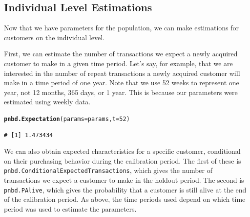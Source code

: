 \documentclass[10pt, letterpaper, onecolumn, oneside, final]{article}\usepackage[]{graphicx}\usepackage[]{color}
\makeatletter
\newcommand{\hlnum}[1]{\textcolor[rgb]{0.686,0.059,0.569}{#1}}%
\newcommand{\hlstd}[1]{\textcolor[rgb]{0.345,0.345,0.345}{#1}}%
\newcommand{\hlkwc}[1]{\textcolor[rgb]{0.333,0.667,0.333}{#1}}%
\newcommand{\hlkwd}[1]{\textcolor[rgb]{0.737,0.353,0.396}{\textbf{#1}}}%
\newenvironment{kframe}{%
 \def\at@end@of@kframe{}%
 \ifinner\ifhmode%
  \def\at@end@of@kframe{\end{minipage}}%
  \begin{minipage}{\columnwidth}%
 \fi\fi%
 \def\FrameCommand##1{\hskip\@totalleftmargin \hskip-\fboxsep
 \colorbox{shadecolor}{##1}\hskip-\fboxsep
     \hskip-\linewidth \hskip-\@totalleftmargin \hskip\columnwidth}%
 \MakeFramed {\advance\hsize-\width
   \@totalleftmargin\z@ \linewidth\hsize
   \@setminipage}}%
 {\par\unskip\endMakeFramed%
 \at@end@of@kframe}
\newenvironment{knitrout}{}{} %
\makeatother
\begin{document}
\subsection{Individual Level Estimations}
Now that we have parameters for the population, we can make
estimations for customers on the individual level.

First, we can estimate the number of transactions we expect a newly
acquired customer to make in a given time period. Let's say, for
example, that we are interested in the number of repeat transactions a
newly acquired customer will make in a time period of one year. Note
that we use 52 weeks to represent one year, not 12 months, 365 days,
or 1 year. This is because our parameters were estimated using weekly
data.

\begin{knitrout}
\color{fgcolor}\begin{kframe}
\begin{alltt}
\hlkwd{pnbd.Expectation}\hlstd{(}\hlkwc{params} \hlstd{= params,} \hlkwc{t} \hlstd{=} \hlnum{52}\hlstd{)}
\end{alltt}
\begin{verbatim}
# [1] 1.473434
\end{verbatim}
\end{kframe}
\end{knitrout}

We can also obtain expected characteristics for a specific customer,
conditional on their purchasing behavior during the calibration
period. The first of these is
\texttt{pnbd.ConditionalExpectedTransactions}, which gives the number
of transactions we expect a customer to make in the holdout
period. The second is \texttt{pnbd.PAlive}, which gives the
probability that a customer is still alive at the end of the
calibration period. As above, the time periods used depend on which
time period was used to estimate the parameters. 
\end{document}

